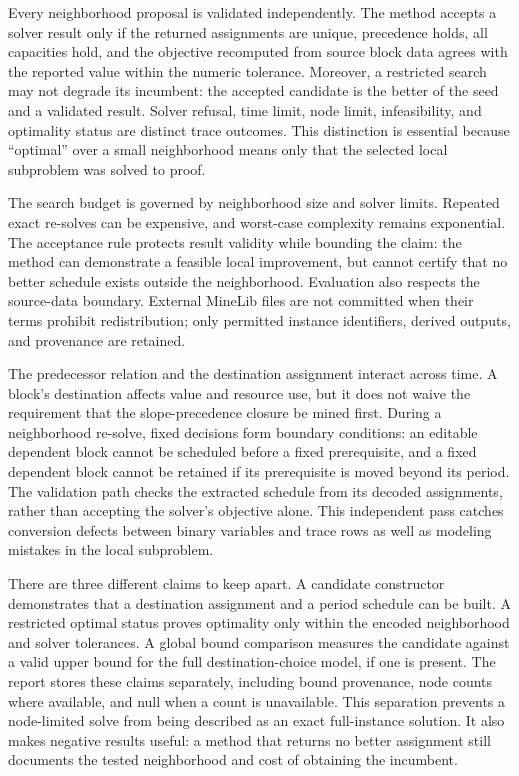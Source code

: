 Every neighborhood proposal is validated independently. The method accepts a solver result only if the returned assignments are unique, precedence holds, all capacities hold, and the objective recomputed from source block data agrees with the reported value within the numeric tolerance. Moreover, a restricted search may not degrade its incumbent: the accepted candidate is the better of the seed and a validated result. Solver refusal, time limit, node limit, infeasibility, and optimality status are distinct trace outcomes. This distinction is essential because “optimal” over a small neighborhood means only that the selected local subproblem was solved to proof.

The search budget is governed by neighborhood size and solver limits. Repeated exact re-solves can be expensive, and worst-case complexity remains exponential. The acceptance rule protects result validity while bounding the claim: the method can demonstrate a feasible local improvement, but cannot certify that no better schedule exists outside the neighborhood. Evaluation also respects the source-data boundary. External MineLib files are not committed when their terms prohibit redistribution; only permitted instance identifiers, derived outputs, and provenance are retained.

The predecessor relation and the destination assignment interact across time. A block's destination affects value and resource use, but it does not waive the requirement that the slope-precedence closure be mined first. During a neighborhood re-solve, fixed decisions form boundary conditions: an editable dependent block cannot be scheduled before a fixed prerequisite, and a fixed dependent block cannot be retained if its prerequisite is moved beyond its period. The validation path checks the extracted schedule from its decoded assignments, rather than accepting the solver's objective alone. This independent pass catches conversion defects between binary variables and trace rows as well as modeling mistakes in the local subproblem.

There are three different claims to keep apart. A candidate constructor demonstrates that a destination assignment and a period schedule can be built. A restricted optimal status proves optimality only within the encoded neighborhood and solver tolerances. A global bound comparison measures the candidate against a valid upper bound for the full destination-choice model, if one is present. The report stores these claims separately, including bound provenance, node counts where available, and null when a count is unavailable. This separation prevents a node-limited solve from being described as an exact full-instance solution. It also makes negative results useful: a method that returns no better assignment still documents the tested neighborhood and cost of obtaining the incumbent.

